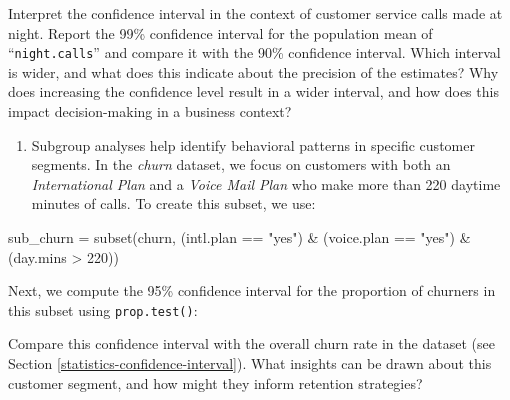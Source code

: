 \documentclass[
  11pt,
]{book}
\makeatletter
\newenvironment{Shaded}{}{}
\newcommand{\AttributeTok}[1]{#1}
\newcommand{\DecValTok}[1]{#1}
\newcommand{\FloatTok}[1]{#1}
\newcommand{\FunctionTok}[1]{#1}
\newcommand{\NormalTok}[1]{#1}
\newcommand{\OtherTok}[1]{\textcolor[rgb]{0.39,0.39,0.39}{#1}}
\newcommand{\SpecialCharTok}[1]{\textcolor[rgb]{0.39,0.39,0.39}{#1}}
\newcommand{\StringTok}[1]{\textcolor[rgb]{0.39,0.39,0.39}{#1}}
\providecommand{\tightlist}{%
  \setlength{\itemsep}{0pt}\setlength{\parskip}{0pt}}
\newenvironment{kframe}{%
\medskip{}
\setlength{\fboxsep}{.8em}
 \def\at@end@of@kframe{}%
 \ifinner\ifhmode%
  \def\at@end@of@kframe{\end{minipage}}%
  \begin{minipage}{\columnwidth}%
 \fi\fi%
 \def\FrameCommand##1{\hskip\@totalleftmargin \hskip-\fboxsep
 \colorbox{shadecolor}{##1}\hskip-\fboxsep
     \hskip-\linewidth \hskip-\@totalleftmargin \hskip\columnwidth}%
 \MakeFramed {\advance\hsize-\width
   \@totalleftmargin\z@ \linewidth\hsize
   \@setminipage}}%
 {\par\unskip\endMakeFramed%
 \at@end@of@kframe}
\renewenvironment{Shaded}{\begin{kframe}}{\end{kframe}}
\theoremstyle{definition}
\theoremstyle{definition}
\theoremstyle{definition}
\theoremstyle{definition}
\theoremstyle{remark}
\makeatother
\begin{document}
Interpret the confidence interval in the context of customer service calls made at night. Report the 99\% confidence interval for the population mean of ``\texttt{night.calls}'' and compare it with the 90\% confidence interval. Which interval is wider, and what does this indicate about the precision of the estimates? Why does increasing the confidence level result in a wider interval, and how does this impact decision-making in a business context?

\begin{enumerate}
\def\labelenumi{\arabic{enumi}.}
\setcounter{enumi}{10}
\tightlist
\item
  Subgroup analyses help identify behavioral patterns in specific customer segments. In the \emph{churn} dataset, we focus on customers with both an \emph{International Plan} and a \emph{Voice Mail Plan} who make more than 220 daytime minutes of calls. To create this subset, we use:
\end{enumerate}

\begin{Shaded}
\begin{Highlighting}[]
\NormalTok{sub\_churn }\OtherTok{=} \FunctionTok{subset}\NormalTok{(churn, (intl.plan }\SpecialCharTok{==} \StringTok{"yes"}\NormalTok{) }\SpecialCharTok{\&}\NormalTok{ (voice.plan }\SpecialCharTok{==} \StringTok{"yes"}\NormalTok{) }\SpecialCharTok{\&}\NormalTok{ (day.mins }\SpecialCharTok{\textgreater{}} \DecValTok{220}\NormalTok{)) }
\end{Highlighting}
\end{Shaded}

Next, we compute the 95\% confidence interval for the proportion of churners in this subset using \texttt{prop.test()}:

\begin{Shaded}
\end{Shaded}

Compare this confidence interval with the overall churn rate in the dataset (see Section \ref{statistics-confidence-interval}). What insights can be drawn about this customer segment, and how might they inform retention strategies?
\end{document}
